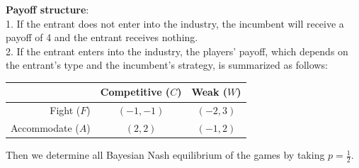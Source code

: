 \documentclass[twoside]{article}
\theoremstyle{definitionstyle}
\begin{document}
\textbf{Payoff structure}:\\
1. If the entrant does not enter into the industry, the incumbent will receive a payoff of 4 and the entrant receives nothing.\\
2. If the entrant enters into the industry, the players' payoff, which depends on the entrant's type and the incumbent's strategy, is summarized as follows:\\
\begin{center}
\begin{tabular}{r|cc}
    & Competitive ($C$) & Weak ($W$) \\ \hline
    Fight ($F$) & $(-1, -1)$ & $(-2, 3)$ \\
    Accommodate ($A$) & $(2, 2)$ & $(-1, 2)$
\end{tabular}
\end{center}

Then we determine all Bayesian Nash equilibrium of the games by taking $p = \frac{1}{2}$.
\end{document}
